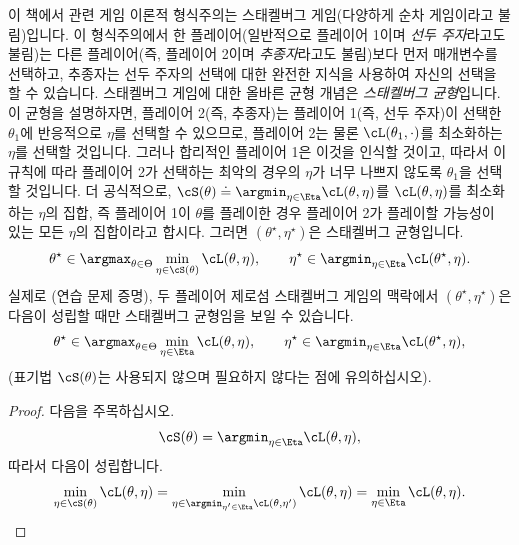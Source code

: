 \documentclass[../../book-main_ko.tex]{subfiles}
\begin{document}
이 책에서 관련 게임 이론적 형식주의는 스태켈버그 게임(다양하게 순차 게임이라고 불림)입니다. 이 형식주의에서 한 플레이어(일반적으로 플레이어 1이며 \textit{선두 주자}라고도 불림)는 다른 플레이어(즉, 플레이어 2이며 \textit{추종자}라고도 불림)보다 먼저 매개변수를 선택하고, 추종자는 선두 주자의 선택에 대한 완전한 지식을 사용하여 자신의 선택을 할 수 있습니다. 스태켈버그 게임에 대한 올바른 균형 개념은 \textit{스태켈버그 균형}입니다. 이 균형을 설명하자면, 플레이어 2(즉, 추종자)는 플레이어 1(즉, 선두 주자)이 선택한 \(\theta_{1}\)에 반응적으로 \(\eta\)를 선택할 수 있으므로, 플레이어 2는 물론 \(\cL(\theta_{1}, \cdot)\)를 최소화하는 \(\eta\)를 선택할 것입니다. 그러나 합리적인 플레이어 1은 이것을 인식할 것이고, 따라서 이 규칙에 따라 플레이어 2가 선택하는 최악의 경우의 \(\eta\)가 너무 나쁘지 않도록 \(\theta_{1}\)을 선택할 것입니다. 더 공식적으로, \(\cS(\theta) \doteq \argmin_{\eta \in \Eta}\cL(\theta, \eta)\)를 \(\cL(\theta, \eta)\)를 최소화하는 \(\eta\)의 집합, 즉 플레이어 1이 \(\theta\)를 플레이한 경우 플레이어 2가 플레이할 가능성이 있는 모든 \(\eta\)의 집합이라고 합시다. 그러면 \((\theta^{\star}, \eta^{\star})\)은 스태켈버그 균형입니다.
\begin{equation}
    \theta^{\star} \in \argmax_{\theta \in \Theta}\min_{\eta \in \cS(\theta)}\cL(\theta, \eta), \qquad \eta^{\star} \in \argmin_{\eta  \in \Eta}\cL(\theta^{\star}, \eta).
\end{equation}
실제로 (연습 문제 증명), 두 플레이어 제로섬 스태켈버그 게임의 맥락에서 \((\theta^{\star}, \eta^{\star})\)은 다음이 성립할 때만 스태켈버그 균형임을 보일 수 있습니다.
\begin{equation}
    \theta^{\star} \in \argmax_{\theta \in \Theta}\min_{\eta \in \Eta}\cL(\theta, \eta), \qquad \eta^{\star} \in \argmin_{\eta  \in \Eta}\cL(\theta^{\star}, \eta),
\end{equation}
(표기법 \(\cS(\theta)\)는 사용되지 않으며 필요하지 않다는 점에 유의하십시오).
\begin{proof} %
    다음을 주목하십시오.
    \begin{equation}
        \cS(\theta) = \argmin_{\eta \in \Eta}\cL(\theta, \eta),
    \end{equation}
    따라서 다음이 성립합니다.
    \begin{equation}
        \min_{\eta \in \cS(\theta)}\cL(\theta, \eta) = \min_{\eta \in \argmin_{\eta^{\prime} \in \Eta}\cL(\theta, \eta^{\prime})}\cL(\theta, \eta) = \min_{\eta \in \Eta}\cL(\theta, \eta).
    \end{equation}
\end{proof}
\end{document}
